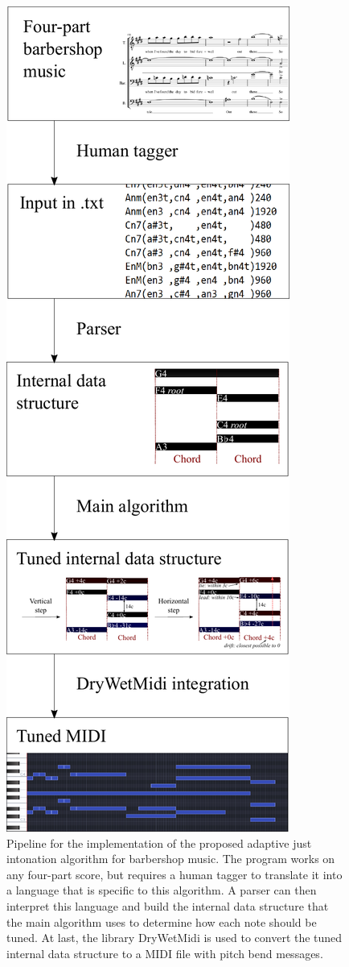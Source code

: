 \documentclass[a4paper]{article}
\begin{document}
\begin{figure}
\centering
\includegraphics[height=0.8\textheight]{Figures/pipeline.pdf}
\caption{Pipeline for the implementation of the proposed adaptive just intonation algorithm for barbershop music. The program works on any four-part score, but requires a human tagger to translate it into a language that is specific to this algorithm. A parser can then interpret this language and build the internal data structure that the main algorithm uses to determine how each note should be tuned. At last, the library DryWetMidi is used to convert the tuned internal data structure to a MIDI file with pitch bend messages.}
\label{fig:pipeline}
\end{figure}
\end{document}
